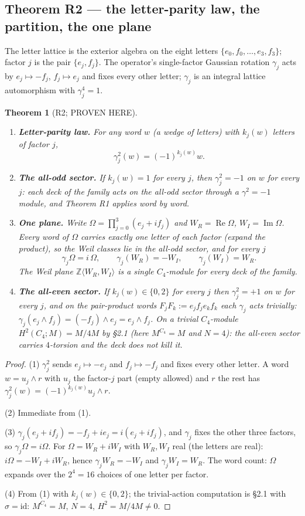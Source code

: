 \documentclass[11pt]{article}
\newtheorem{theorem}{Theorem}
\newcommand{\Z}{\mathbb Z}
\begin{document}
\subsection{Theorem R2 --- the letter-parity law, the partition, the one plane}

The letter lattice is the exterior algebra on the eight letters
$\{e_0,f_0,\ldots,e_3,f_3\}$; factor $j$ is the pair $\{e_j,f_j\}$. The
operator's single-factor Gaussian rotation
$\gamma_j$ acts by $e_j\mapsto-f_j$, $f_j\mapsto e_j$ and fixes every
other letter; $\gamma_j$ is an integral lattice automorphism with
$\gamma_j^4=1$.

\begin{theorem}[R2; PROVEN HERE]
\begin{enumerate}
\item \textbf{Letter-parity law.} For any word $w$ (a wedge of letters)
with $k_j(w)$ letters of factor $j$,
\[
\gamma_j^2(w)=(-1)^{k_j(w)}w .
\]
\item \textbf{The all-odd sector.} If $k_j(w)=1$ for every $j$, then
$\gamma_j^2=-1$ on $w$ for \emph{every} $j$: each deck of the family acts
on the all-odd sector through a $\gamma^2=-1$ module, and Theorem R1
applies word by word.
\item \textbf{One plane.} Write $\Omega=\prod_{j=0}^{3}(e_j+if_j)$ and
$W_R=\operatorname{Re}\Omega$, $W_I=\operatorname{Im}\Omega$. Every word
of $\Omega$ carries exactly one letter of each factor (expand the
product), so the Weil classes lie in the all-odd sector, and for every
$j$
\[
\gamma_j\Omega=i\,\Omega,\qquad
\gamma_j(W_R)=-W_I,\qquad \gamma_j(W_I)=W_R .
\]
The Weil plane $\Z\langle W_R,W_I\rangle$ is a single $C_4$-module for
every deck of the family.
\item \textbf{The all-even sector.} If $k_j(w)\in\{0,2\}$ for every $j$
then $\gamma_j^2=+1$ on $w$ for every $j$, and on the pair-product words
$F_jF_k:=e_jf_je_kf_k$ each $\gamma_j$ acts trivially:
$\gamma_j(e_j\wedge f_j)=(-f_j)\wedge e_j=e_j\wedge f_j$. On a trivial
$C_4$-module $H^2(C_4;M)=M/4M$ by \S2.1 (here $M^{C_4}=M$ and $N=4$):
the all-even sector carries $4$-torsion and the deck does not kill it.
\end{enumerate}
\end{theorem}

\begin{proof}
(1) $\gamma_j^2$ sends $e_j\mapsto-e_j$ and $f_j\mapsto-f_j$ and fixes
every other letter. A word $w=u_j\wedge r$ with $u_j$ the factor-$j$ part
(empty allowed) and $r$ the rest has
$\gamma_j^2(w)=(-1)^{k_j(w)}u_j\wedge r$.

(2) Immediate from (1).

(3) $\gamma_j(e_j+if_j)=-f_j+ie_j=i(e_j+if_j)$, and $\gamma_j$ fixes the
other three factors, so $\gamma_j\Omega=i\Omega$. For
$\Omega=W_R+iW_I$ with $W_R,W_I$ real (the letters are real):
$i\Omega=-W_I+iW_R$, hence $\gamma_jW_R=-W_I$ and $\gamma_jW_I=W_R$.
The word count: $\Omega$ expands over the $2^4=16$ choices of one letter
per factor.

(4) From (1) with $k_j(w)\in\{0,2\}$; the trivial-action computation is
\S2.1 with $\sigma=\mathrm{id}$: $M^{C_4}=M$, $N=4$,
$H^2=M/4M\ne0$.
\end{proof}
\end{document}
